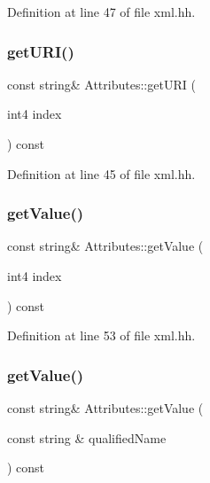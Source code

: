 Definition at line 47 of file xml.\+hh.

\mbox{\label{class_attributes_ae14e94adde0a7916fff11e6aa689a556}} 
\subsubsection{\texorpdfstring{getURI()}{getURI()}}
{\footnotesize\ttfamily const string\& Attributes\+::get\+U\+RI (\begin{DoxyParamCaption}\item[{int4}]{index }\end{DoxyParamCaption}) const\hspace{0.3cm}{\ttfamily [inline]}}



Definition at line 45 of file xml.\+hh.

\mbox{\label{class_attributes_a524876a223428293240fb40a3e480d70}} 
\subsubsection{\texorpdfstring{getValue()}{getValue()}\hspace{0.1cm}{\footnotesize\ttfamily [1/2]}}
{\footnotesize\ttfamily const string\& Attributes\+::get\+Value (\begin{DoxyParamCaption}\item[{int4}]{index }\end{DoxyParamCaption}) const\hspace{0.3cm}{\ttfamily [inline]}}



Definition at line 53 of file xml.\+hh.

\mbox{\label{class_attributes_a0f76e455894d4f5ac542389c640bc510}} 
\subsubsection{\texorpdfstring{getValue()}{getValue()}\hspace{0.1cm}{\footnotesize\ttfamily [2/2]}}
{\footnotesize\ttfamily const string\& Attributes\+::get\+Value (\begin{DoxyParamCaption}\item[{const string \&}]{qualified\+Name }\end{DoxyParamCaption}) const\hspace{0.3cm}{\ttfamily [inline]}}



